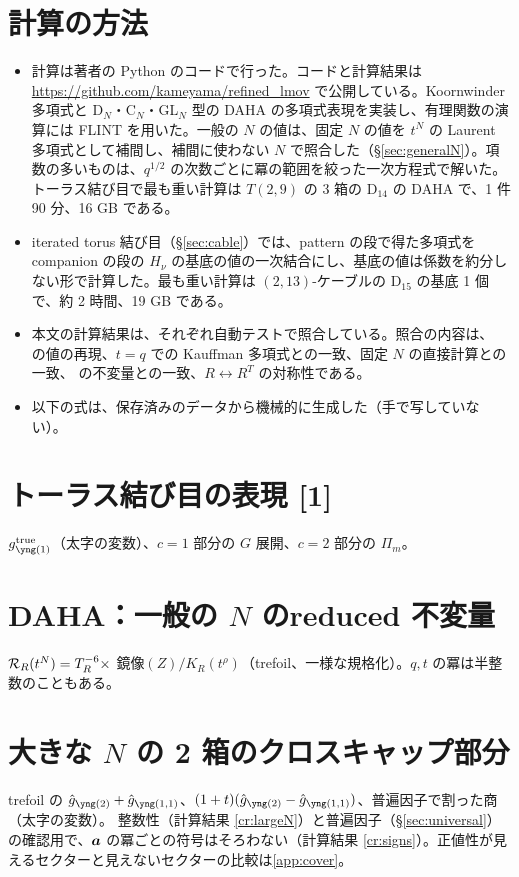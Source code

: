 \section{計算の方法}\label{app:code}
\begin{itemize}
\item 計算は著者の Python のコードで行った。コードと計算結果は \url{https://github.com/kameyama/refined_lmov} で公開している。Koornwinder 多項式と D$_N$・C$_N$・GL$_N$ 型の DAHA の多項式表現を実装し、有理関数の演算には FLINT を用いた。一般の $N$ の値は、固定 $N$ の値を $t^N$ の Laurent 多項式として補間し、補間に使わない $N$ で照合した（§\ref{sec:generalN}）。項数の多いものは、$q^{1/2}$ の次数ごとに冪の範囲を絞った一次方程式で解いた。トーラス結び目で最も重い計算は $T(2,9)$ の 3 箱の D$_{14}$ の DAHA で、1 件 90 分、16 GB である。
\item iterated torus 結び目（§\ref{sec:cable}）では、pattern の段で得た多項式を companion の段の $H_\nu$ の基底の値の一次結合にし、基底の値は係数を約分しない形で計算した。最も重い計算は $(2,13)$-ケーブルの D$_{15}$ の基底 1 個で、約 2 時間、19 GB である。
\item 本文の計算結果は、それぞれ自動テストで照合している。照合の内容は、\cite{Marino09} の値の再現、$t = q$ での Kauffman 多項式との一致、固定 $N$ の直接計算との一致、\cite{KN17} の不変量との一致、$R \leftrightarrow R^T$ の対称性である。
\item 以下の式は、保存済みのデータから機械的に生成した（手で写していない）。
\end{itemize}

\section{トーラス結び目の表現 [1]}\label{app:torus}
$g^{\mathrm{true}}_{\yone}$（太字の変数）、$c = 1$ 部分の $G$ 展開、$c = 2$ 部分の $\Pi_m$。


\section{DAHA：一般の $N$ のreduced 不変量}\label{app:daha}
$\mathcal{R}_R(t^N) = T_R^{-6}\times$ 鏡像$(Z)/K_R(t^\rho)$（trefoil、一様な規格化）。$q, t$ の冪は半整数のこともある。


\section{大きな $N$ の 2 箱のクロスキャップ部分}\label{app:largeN}
trefoil の $\hat g_{\ytwo} + \hat g_{\yoneone}$、$(1+t)(\hat g_{\ytwo} - \hat g_{\yoneone})$、普遍因子で割った商（太字の変数）。
整数性（計算結果 \ref{cr:largeN}）と普遍因子（§\ref{sec:universal}）の確認用で、$\bm{a}$ の冪ごとの符号はそろわない（計算結果 \ref{cr:signs}）。正値性が見えるセクターと見えないセクターの比較は\ref{app:cover}。


